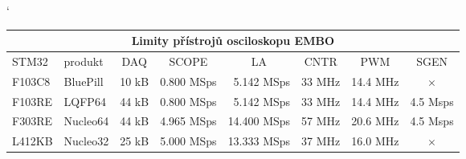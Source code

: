 \documentclass{article}
\begin{document}
\begin{table}[!htbp]
\catcode`
\bgroup
\def\arraystretch{1.5}%
\begin{tabular}  { |l|l||c|c|c|c|c|c| }
 \hline
 \multicolumn{8}{|c|}{ Limity přístrojů osciloskopu EMBO } \\
 \hline
 STM32 & produkt & DAQ & SCOPE & LA & CNTR & PWM & SGEN \\
 \hhline{|=|=||=|=|=|=|=|=|}
F103C8 & BluePill & 10 kB & 0.800 MSps & \,\,\,5.142 MSps & 33 MHz & 14.4 MHz & $\times$  \\
F103RE & LQFP64 & 44 kB & 0.800 MSps & \,\,\,5.142 MSps & 33 MHz & 14.4 MHz & 4.5 Msps  \\
F303RE & Nucleo64 & 44 kB & 4.965 MSps & 14.400 MSps & 57 MHz & 20.6 MHz & 4.5 Msps  \\
L412KB & Nucleo32 & 25 kB & 5.000 MSps & 13.333 MSps & 37 MHz & 16.0 MHz & $\times$ \\
 \hline
\end{tabular}
\egroup
\end{table}
\end{document}

